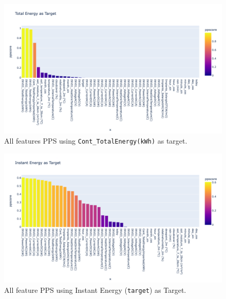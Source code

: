 %
\begin{figure}[H]
	\centering
	\includegraphics[width=.9\textwidth, keepaspectratio]{chapters/2_data_preprocessing/imgs/ppcontottenergy.png}
	\caption{All features PPS using \texttt{Cont\_TotalEnergy(kWh)} as target.}\label{fig:ppsTotEnergy}
\end{figure}


\begin{figure}[H]
	\centering
	\includegraphics[width=.9\textwidth, keepaspectratio]{chapters/2_data_preprocessing/imgs/pptarget.png}
	\caption{All feature PPS using Instant Energy (\texttt{target}) as Target.}\label{fig:ppstarget}
\end{figure}

